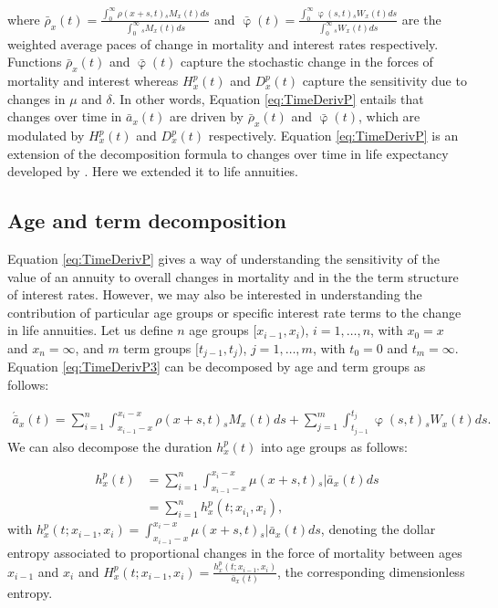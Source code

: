 \documentclass[12pt]{article}
\begin{document}
where $\bar{\rho}_x(t)= \frac{\int_0^\infty \rho(x+s,t) {}_sM_x(t)  ds}{\int_0^\infty  {}_sM_x(t)ds}$ and 
$\bar{\upvarphi}(t)= \frac{\int_0^\infty \upvarphi(s,t) {}_sW_x(t)  ds}{\int_0^\infty {}_sW_x(t) ds}$ are the weighted average paces of change in mortality and interest rates respectively. Functions $\bar{\rho}_x(t)$ and $\bar{\upvarphi}(t)$ capture the stochastic change in the forces of mortality and interest whereas ${H}^{p}_x(t)$ and ${D}^{p}_x(t)$ capture the sensitivity due to changes in $\mu$ and $\delta$. In other words, Equation \ref{eq:TimeDerivP} entails that changes over time in $\bar{a}_x(t)$ are driven by $\bar{\rho}_x(t)$ and $\bar{\upvarphi}(t)$, which are modulated by ${H}^{p}_x(t)$ and ${D}^{p}_x(t)$ respectively. Equation \ref{eq:TimeDerivP} is an extension of the decomposition formula to changes over time in life expectancy developed by \citet{Vaupel2003}. Here we extended it to life annuities.


\subsection{Age and term decomposition}

Equation \ref{eq:TimeDerivP} gives a way of understanding the sensitivity of the value of an annuity to overall changes in mortality and in the the term structure of interest rates. However, we may also be interested in understanding the contribution of particular age groups or specific interest rate terms to the change in life annuities. Let us define $n$ age groups $[x_{i-1}, x_i)$, $i=1,\ldots,n$, with $x_0=x$ and $x_n=\infty$, and $m$ term groups $[t_{j-1}, t_j)$, $j=1,\ldots,m$, with $t_0=0$ and $t_m=\infty$. Equation \ref{eq:TimeDerivP3} can be decomposed by age and term groups as follows:

\begin{equation}\label{eq:TimeDerivAge}
\begin{split}
 \acute{\bar{a}}_x(t) = \sum_{i=1}^n\int_{x_{i-1}-x}^{x_i-x}  \rho(x+s,t) {}_sM_x(t)  ds +\sum_{j=1}^m\int_{t_{j-1}}^{t_j}   \upvarphi(s,t) {}_sW_x(t)  ds.  
\end{split}
\end{equation}
We can also decompose the duration $h_x^p(t)$ into age groups as follows:

\begin{equation} \label{eq:EntropyAge}
\begin{split}
{h}^{p}_{x}(t) &=  \sum_{i=1}^n\int_{x_{i-1}-x}^{x_i-x} \mu(x+s,t)   {}_s|\bar{a}_x(t) ds \\
&=  \sum_{i=1}^n {h}^{p}_{x}(t;x_{i_1},x_{i}),
\end{split}
\end{equation}
with ${h}^{p}_{x}(t;x_{i-1},x_{i})=\int_{x_{i-1}-x}^{x_i-x} \mu(x+s,t)   {}_s|\bar{a}_x(t) ds$, denoting the dollar entropy associated to proportional changes in the force of mortality between ages $x_{i-1}$ and $x_{i}$ and ${H}^{p}_{x}(t;x_{i-1},x_{i}) = \frac{{h}^{p}_{x}(t;x_{i-1},x_{i})}{\bar{a}_x(t)}$, the corresponding dimensionless entropy. 
\end{document}

